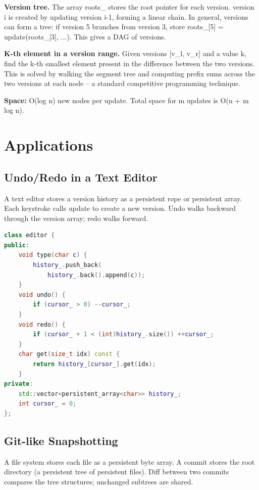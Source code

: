 \textbf{Version tree.} The array roots\_ stores the root pointer for each version. version i is created by updating version i-1, forming a linear chain. In general, versions can form a tree: if version 5 branches from version 3, store roots\_[5] = update(roots\_[3], ...). This gives a DAG of versions.

\textbf{K-th element in a version range.} Given versions [v\_l, v\_r] and a value k, find the k-th smallest element present in the difference between the two versions. This is solved by walking the segment tree and computing prefix sums across the two versions at each node -- a standard competitive programming technique.

\textbf{Space:} O(log n) new nodes per update. Total space for m updates is O(n + m log n).

\section{Applications}\label{sec21:applications}

\subsection{Undo/Redo in a Text Editor}

A text editor stores a version history as a persistent rope or persistent array. Each keystroke calls update to create a new version. Undo walks backward through the version array; redo walks forward.

\begin{lstlisting}[language=C++]
class editor {
public:
    void type(char c) {
        history_.push_back(
            history_.back().append(c));
    }
    void undo() {
        if (cursor_ > 0) --cursor_;
    }
    void redo() {
        if (cursor_ + 1 < (int)history_.size()) ++cursor_;
    }
    char get(size_t idx) const {
        return history_[cursor_].get(idx);
    }
private:
    std::vector<persistent_array<char>> history_;
    int cursor_ = 0;
};
\end{lstlisting}

\subsection{Git-like Snapshotting}

A file system stores each file as a persistent byte array. A commit stores the root directory (a persistent tree of persistent files). Diff between two commits compares the tree structures; unchanged subtrees are shared.

